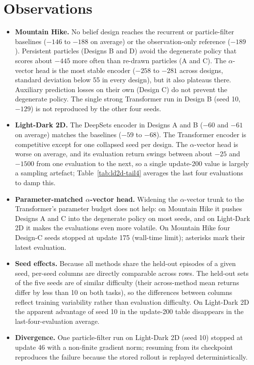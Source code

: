 \documentclass[11pt]{article}
\begin{document}
\newpage
\section{Observations}

\begin{itemize}
  \item \textbf{Mountain Hike.} No belief design reaches the recurrent or particle-filter baselines ($-146$ to $-188$ on average) or the observation-only reference ($-189$). Persistent particles (Designs B and D) avoid the degenerate policy that scores about $-445$ more often than re-drawn particles (A and C). The $\alpha$-vector head is the most stable encoder ($-258$ to $-281$ across designs, standard deviation below 55 in every design), but it also plateaus there. Auxiliary prediction losses on their own (Design C) do not prevent the degenerate policy. The single strong Transformer run in Design B (seed 10, $-129$) is not reproduced by the other four seeds.
  \item \textbf{Light-Dark 2D.} The DeepSets encoder in Designs A and B ($-60$ and $-61$ on average) matches the baselines ($-59$ to $-68$). The Transformer encoder is competitive except for one collapsed seed per design. The $\alpha$-vector head is worse on average, and its evaluation return swings between about $-25$ and $-1500$ from one evaluation to the next, so a single update-200 value is largely a sampling artefact; Table~\ref{tab:ld2d-tail4} averages the last four evaluations to damp this.
  \item \textbf{Parameter-matched $\alpha$-vector head.} Widening the $\alpha$-vector trunk to the Transformer's parameter budget does not help: on Mountain Hike it pushes Designs A and C into the degenerate policy on most seeds, and on Light-Dark 2D it makes the evaluations even more volatile. On Mountain Hike four Design-C seeds stopped at update 175 (wall-time limit); asterisks mark their latest evaluation.
  \item \textbf{Seed effects.} Because all methods share the held-out episodes of a given seed, per-seed columns are directly comparable across rows. The held-out sets of the five seeds are of similar difficulty (their across-method mean returns differ by less than 10 on both tasks), so the differences between columns reflect training variability rather than evaluation difficulty. On Light-Dark 2D the apparent advantage of seed 10 in the update-200 table disappears in the last-four-evaluation average.
  \item \textbf{Divergence.} One particle-filter run on Light-Dark 2D (seed 10) stopped at update 46 with a non-finite gradient norm; resuming from its checkpoint reproduces the failure because the stored rollout is replayed deterministically.
\end{itemize}
\end{document}
